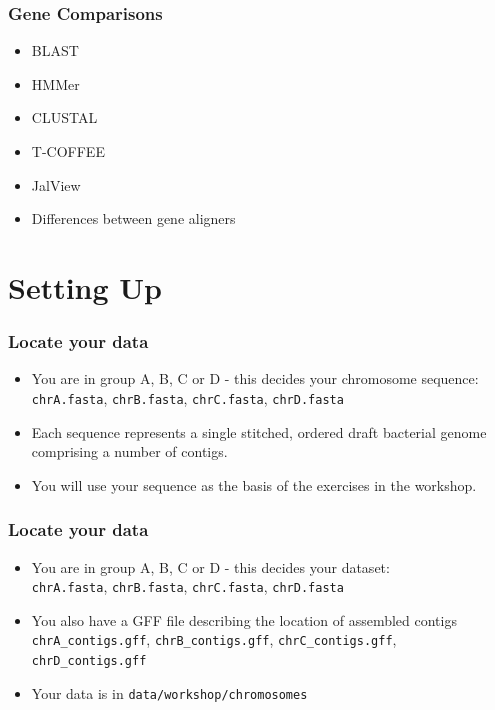 \documentclass[table]{beamer}
\begin{document}
    \begin{frame}
     \frametitle{Gene Comparisons}
     \begin{itemize}
       \item BLAST
       \item HMMer
       \item CLUSTAL
       \item T-COFFEE
       \item JalView
       \item Differences between gene aligners
     \end{itemize}
    \end{frame}


  \section{Setting Up}
  \begin{frame}
    \frametitle{Locate your data}
    \begin{itemize}
      \item You are in group A, B, C or D - this decides your chromosome sequence: \\
      \texttt{chrA.fasta}, \texttt{chrB.fasta}, \texttt{chrC.fasta}, \texttt{chrD.fasta}
      \item Each sequence represents a single stitched, ordered draft bacterial genome comprising a number of contigs.
      \item You will use your sequence as the basis of the exercises in the workshop.
    \end{itemize}
  \end{frame}  
  
  \begin{frame}
    \frametitle{Locate your data}
    \begin{itemize}
      \item You are in group A, B, C or D - this decides your dataset: \\
      \texttt{chrA.fasta}, \texttt{chrB.fasta}, \texttt{chrC.fasta}, \texttt{chrD.fasta}
      \item You also have a GFF file describing the location of assembled contigs \\
      \texttt{chrA\_contigs.gff}, \texttt{chrB\_contigs.gff}, \texttt{chrC\_contigs.gff}, \texttt{chrD\_contigs.gff}
      \item Your data is in \texttt{data/workshop/chromosomes}
    \end{itemize}
  \end{frame}    
  
\end{document}
